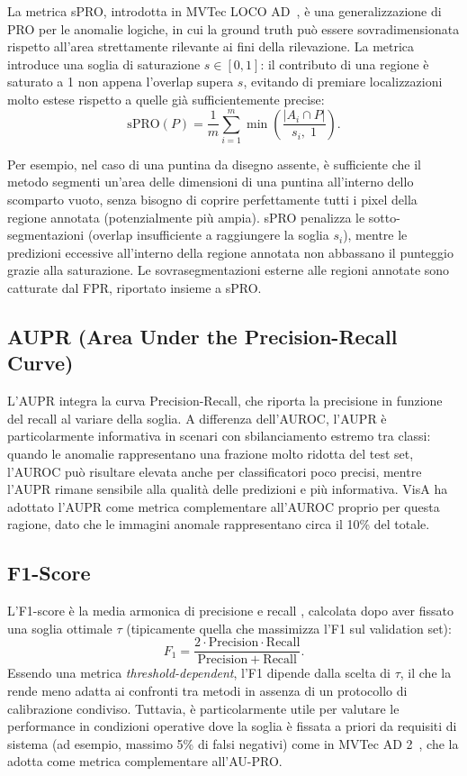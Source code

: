 La metrica sPRO, introdotta in MVTec LOCO AD~\cite{bergmann2022beyond}, è una generalizzazione di PRO per le anomalie logiche, in cui la ground truth può essere sovradimensionata rispetto all'area strettamente rilevante ai fini della rilevazione. La metrica introduce una soglia di saturazione $s \in [0,1]$: il contributo di una regione è saturato a 1 non appena l'overlap supera $s$, evitando di premiare localizzazioni molto estese rispetto a quelle già sufficientemente precise:
\[
  \mathrm{sPRO}(P) = \frac{1}{m}\sum_{i=1}^{m}
    \min\!\left(\frac{|A_i \cap P|}{s_i,\;1}\right).
\]


Per esempio, nel caso di una puntina da disegno assente, è sufficiente che il metodo segmenti un'area delle dimensioni di una puntina all'interno dello scomparto vuoto, senza bisogno di coprire perfettamente tutti i pixel della regione annotata (potenzialmente più ampia). sPRO penalizza le sotto-segmentazioni (overlap insufficiente a raggiungere 
la soglia $s_i$), mentre le predizioni eccessive all'interno della regione annotata non abbassano il punteggio grazie alla saturazione. Le sovrasegmentazioni esterne alle regioni annotate sono catturate dal FPR, riportato insieme a sPRO.

\subsection{AUPR (Area Under the Precision-Recall Curve)}
\label{subsec:aupr}

L'AUPR integra la curva Precision-Recall, che riporta la precisione in funzione del recall \cite{davis2006precisionrecall} al variare della soglia. A differenza dell'AUROC, l'AUPR è particolarmente informativa in scenari con sbilanciamento estremo tra classi: quando le anomalie rappresentano una frazione molto ridotta del test set, l'AUROC può risultare elevata anche per classificatori poco precisi, mentre l'AUPR rimane sensibile alla qualità delle predizioni e più informativa. VisA \cite{zou2022spot} ha adottato l'AUPR come metrica complementare all'AUROC proprio per questa ragione, dato che le immagini anomale rappresentano circa il 10\% del totale.

\subsection{F1-Score}
\label{subsec:f1}

L'F1-score è la media armonica di precisione e recall \cite{davis2006precisionrecall}, calcolata dopo aver fissato una soglia ottimale $\tau$ (tipicamente quella che massimizza l'F1 sul validation set):
\[
  F_1 = \frac{2\cdot\mathrm{Precision}\cdot\mathrm{Recall}}{\mathrm{Precision}+\mathrm{Recall}}.
\]
Essendo una metrica \textit{threshold-dependent}, l'F1 dipende dalla scelta di $\tau$, il che la rende meno adatta ai confronti tra metodi in assenza di un protocollo di calibrazione condiviso. Tuttavia, è particolarmente utile per valutare le performance in condizioni operative dove la soglia è fissata a priori da requisiti di sistema (ad esempio, massimo 5\% di falsi negativi) come in MVTec AD 2~\cite{bergmann2025mvtecad2}, che la adotta come metrica complementare all'AU-PRO.

